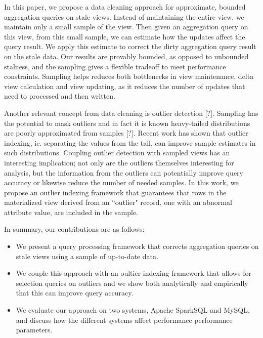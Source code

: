 In this paper, we propose a data cleaning approach for approximate,
bounded aggregation queries on stale views. Instead of maintaining
the entire view, we maintain only a small sample of the view. Then
given an aggregation query on this view, from this small sample, we
can estimate how the updates affect the query result. We apply this
estimate to correct the dirty aggregation query result on the stale
data. Our results are provably bounded, as opposed to unbounded stalness,
and the sampling gives a flexible tradeoff to meet performance constraints.
Sampling helps reduces both bottlenecks in view maintenance, delta
view calculation and view updating, as it reduces the number of updates
that need to processed and then written.

Another relevant concept from data cleaning is outlier detection {[}?{]}.
Sampling has the potential to mask outliers and in fact it is known
heavy-tailed distributions are poorly approximated from samples {[}?{]}.
Recent work has shown that outlier indexing, ie. separating the values
from the tail, can improve sample estimates in such distributions.
Coupling outlier detection with sampled views has an interesting implication;
not only are the outliers themselves interesting for analysis, but
the information from the outliers can potentially improve query accuracy
or likewise reduce the number of needed samples.
In this work, we propose an outlier indexing framework that guarantees that
rows in the materialized view derived from an ``outlier" record, one with
an abnormal attribute value, are included in the sample.

In summary, our contributions are as follows:
\begin{itemize}
\item We present a query processing framework that corrects aggregation queries on stale
views using a sample of up-to-date data.
\item We couple this approach with an oultier indexing framework that allows
for selection queries on outliers and we show both analytically and empirically that 
this can improve query accuracy.
\item We evaluate our approach on two systems, Apache SparkSQL and MySQL,
and discuss how the different systems affect performance performance
parameters.
\end{itemize}